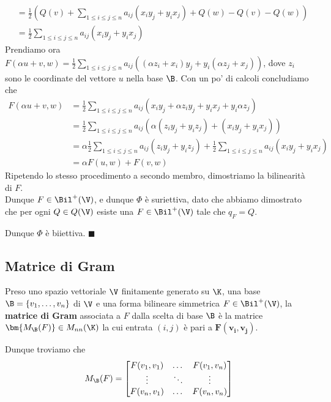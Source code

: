\documentclass[11pt, a4paper, titlepage, oneside]{scrbook}
\begin{document}
\begin{itemize}
\begin{itemize}
\begin{align*}
         &= \frac{1}{2}(Q(v) + \sum_{1 \leq i \leq j \leq n} a_{ij}(x_i y_j + y_i x_j) + Q(w) - Q(v) - Q(w)) \\
         &= \frac{1}{2} \sum_{1 \leq i \leq j \leq n} a_{ij} (x_i y_j + y_i x_j)
        \end{align*}
        Prendiamo ora $F(\alpha u + v, w) = \frac{1}{2} \sum_{1 \leq i \leq j \leq n} a_{ij} ((\alpha z_i + x_i) y_j + y_i (\alpha z_j + x_j))$, dove $z_i$ sono le coordinate del vettore $u$ nella base $\B$. Con un po' di calcoli concludiamo che
        \begin{align*}
        F(\alpha u + v, w) &=  \frac{1}{2} \sum_{1 \leq i \leq j \leq n} a_{ij}(x_i y_j + \alpha z_i y_j + y_i x_j + y_i \alpha z_j) \\
         &= \frac{1}{2} \sum_{1 \leq i \leq j \leq n} a_{ij}(\alpha (z_i y_j + y_i z_j) + (x_i y_j + y_i x_j)) \\
         &= \alpha \frac{1}{2} \sum_{1 \leq i \leq j \leq n} a_{ij} (z_i y_j + y_i z_j) + \frac{1}{2} \sum_{1 \leq i \leq j \leq n} a_{ij}(x_i y_j + y_i x_j) \\
         &= \alpha F(u,w) + F(v,w)
        \end{align*}
        Ripetendo lo stesso procedimento a secondo membro, dimostriamo la bilinearità di $F$. \\
        Dunque $F \in \Bil^+(\V)$, e dunque $\Phi$ è suriettiva, dato che abbiamo dimostrato che per ogni $Q \in Q(\V)$ esiste una $F \in \Bil^+(\V)$ tale che $q_F = Q$.
    \end{itemize}
    Dunque $\Phi$ è biiettiva. $\blacksquare$
\end{itemize}

\subsection{Matrice di Gram}

\begin{Definizione}
\label{def-matrice-di-gram}
Preso uno spazio vettoriale $\V$ finitamente generato su $\K$, una base $\B = \{v_1, \ldots, v_n\}$ di $\V$ e una forma bilineare simmetrica $F \in \Bil^+(\V)$, la \textbf{matrice di Gram} associata a $F$ dalla scelta di base $\B$ è la matrice $\bm{M_\B(F)} \in M_{nn}(\K)$ la cui entrata $(i,j)$ è pari a $\bm{F(v_i,v_j)}$.
\end{Definizione}

Dunque troviamo che
\[
M_\B(F) = \begin{bmatrix}
    F(v_1,v_1) & \dots & F(v_1, v_n) \\
    \vdots & \ddots & \vdots \\
    F(v_n,v_1) & \dots & F(v_n,v_n)
\end{bmatrix}
\]
\end{document}
